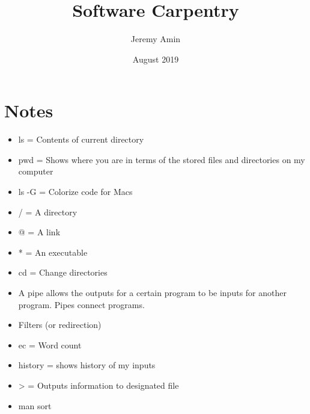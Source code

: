 \documentclass{article}
\title{Software Carpentry}
\author{Jeremy Amin}
\date{August 2019}
\begin{document}
\maketitle

\section{Notes}

\begin{itemize}
    \item ls = Contents of current directory
    \item pwd = Shows where you are in terms of the stored files and directories on my computer
    \item ls -G = Colorize code for Macs
    \item / = A directory
    \item @ = A link
    \item * = An executable
    \item cd = Change directories
    \item A pipe allows the outputs for a certain program to be inputs for another program. Pipes connect programs.
    \item Filters (or redirection)
    \item ec = Word count
    \item history = shows history of my inputs
    \item > = Outputs information to designated file
    \item man sort
\end{itemize}
\end{document}
